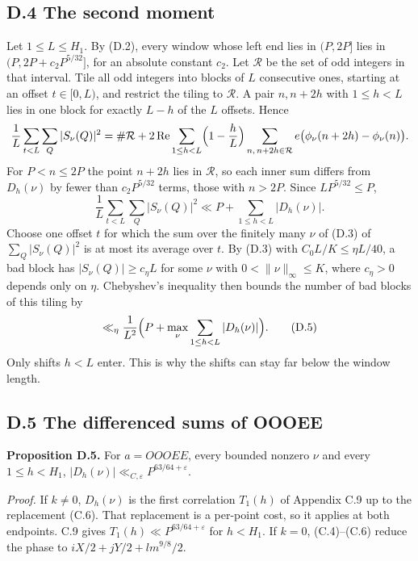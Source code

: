 \documentclass[11pt,a4paper]{article}
\begin{document}
\subsection{D.4 The second moment}\label{d.4-the-second-moment}

Let \(1\le L\le H_1\). By (D.2), every window whose left end lies in
\((P,2P]\) lies in \((P,2P+c_2P^{5/32}]\), for an absolute constant
\(c_2\). Let \(\mathcal R\) be the set of odd integers in that interval.
Tile all odd integers into blocks of \(L\) consecutive ones, starting at
an offset \(t\in[0,L)\), and restrict the tiling to \(\mathcal R\). A
pair \(n,n+2h\) with \(1\le h<L\) lies in one block for exactly \(L-h\)
of the \(L\) offsets. Hence \[
\frac1L\sum_{t<L}\sum_Q|S_\nu(Q)|^2
=\#\mathcal R+2\,\mathrm{Re}\sum_{1\le h<L}\Bigl(1-\frac hL\Bigr)
\sum_{n,\,n+2h\in\mathcal R}e\bigl(\phi_\nu(n+2h)-\phi_\nu(n)\bigr).
\] For \(P<n\le2P\) the point \(n+2h\) lies in \(\mathcal R\), so each
inner sum differs from \(D_h(\nu)\) by fewer than \(c_2P^{5/32}\) terms,
those with \(n>2P\). Since \(LP^{5/32}\le P\), \[
\frac1L\sum_{t<L}\sum_Q|S_\nu(Q)|^2
\ll P+\sum_{1\le h<L}|D_h(\nu)|.
\tag{D.4}
\] Choose one offset \(t\) for which the sum over the finitely many
\(\nu\) of (D.3) of \(\sum_Q|S_\nu(Q)|^2\) is at most its average over
\(t\). By (D.3) with \(C_0L/K\le\eta L/40\), a bad block has
\(|S_\nu(Q)|\ge c_\eta L\) for some \(\nu\) with
\(0<\|\nu\|_\infty\le K\), where \(c_\eta>0\) depends only on \(\eta\).
Chebyshev's inequality then bounds the number of bad blocks of this
tiling by \[
\ll_\eta\frac1{L^2}\Bigl(P+\max_{\nu}\sum_{1\le h<L}|D_h(\nu)|\Bigr).
\tag{D.5}
\] Only shifts \(h<L\) enter. This is why the shifts can stay far below
the window length.


\subsection{D.5 The differenced sums of
OOOEE}\label{d.5-the-differenced-sums-of-oooee}

\textbf{Proposition D.5.} For \(a=OOOEE\), every bounded nonzero \(\nu\)
and every \(1\le h<H_1\),
\(|D_h(\nu)|\ll_{C,\varepsilon}P^{63/64+\varepsilon}\).

\emph{Proof.} If \(k\ne0\), \(D_h(\nu)\) is the first correlation
\(T_1(h)\) of Appendix C.9 up to the replacement (C.6). That replacement
is a per-point cost, so it applies at both endpoints. C.9 gives
\(T_1(h)\ll P^{63/64+\varepsilon}\) for \(h<H_1\). If \(k=0\),
(C.4)--(C.6) reduce the phase to \(iX/2+jY/2+lm^{9/8}/2\).
\end{document}
